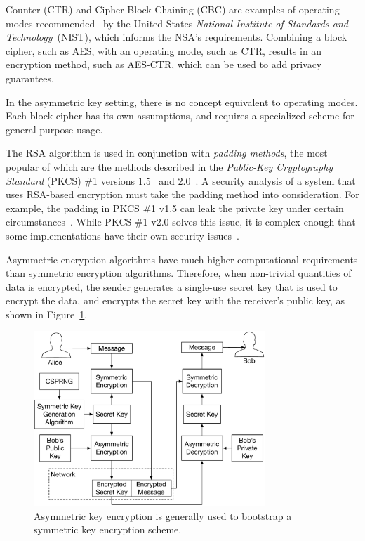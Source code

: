 Counter (CTR) and Cipher Block Chaining (CBC) are examples of operating modes
recommended~\cite{fips2001ctr} by the United States \textit{National Institute
of Standards and Technology}~(NIST), which informs the NSA's requirements.
Combining a block cipher, such as AES, with an operating mode, such as CTR,
results in an encryption method, such as AES-CTR, which can be used to add
privacy guarantees.

In the asymmetric key setting, there is no concept equivalent to operating
modes. Each block cipher has its own assumptions, and requires a specialized
scheme for general-purpose usage.

The RSA algorithm is used in conjunction with \textit{padding methods}, the
most popular of which are the methods described in the \textit{Public-Key
Cryptography Standard} (PKCS) \#1 versions 1.5~\cite{kaliski1998pkcs1v15} and
2.0~\cite{kaliski1998pkcs1v2}. A security analysis of a system that uses
RSA-based encryption must take the padding method into consideration. For
example, the padding in PKCS \#1 v1.5 can leak the private key under certain
circumstances~\cite{bleichenbacher1998pkcs1v15cca}. While PKCS \#1 v2.0 solves
this issue, it is complex enough that some implementations have their own
security issues~\cite{manger2001pkcs1v20attack}.

Asymmetric encryption algorithms have much higher computational requirements
than symmetric encryption algorithms. Therefore, when non-trivial quantities of
data is encrypted, the sender generates a single-use secret key that is used
to encrypt the data, and encrypts the secret key with the receiver's public
key, as shown in Figure~\ref{fig:asymmetric_encryption}.

\begin{figure}[hbt]
  \centering
  \includegraphics[width=87mm]{figures/asymmetric_encryption.pdf}
  \caption{
    Asymmetric key encryption is generally used to bootstrap a symmetric
    key encryption scheme.
  }
  \label{fig:asymmetric_encryption}
\end{figure}



